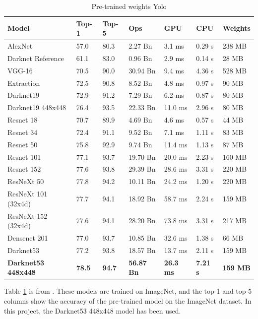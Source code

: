 \begin{table}[h!]
\begin{tabular}{lllllll}
Model               & Top-1 & Top-5 & Ops      & GPU     & CPU    & Weights \\ \hline
AlexNet             & 57.0  & 80.3  & 2.27 Bn  & 3.1 ms  & 0.29 s & 238 MB  \\
Darknet Reference   & 61.1  & 83.0  & 0.96 Bn  & 2.9 ms  & 0.14 s & 28 MB   \\
VGG-16              & 70.5  & 90.0  & 30.94 Bn & 9.4 ms  & 4.36 s & 528 MB  \\
Extraction          & 72.5  & 90.8  & 8.52 Bn  & 4.8 ms  & 0.97 s & 90 MB   \\
Darknet19           & 72.9  & 91.2  & 7.29 Bn  & 6.2 ms  & 0.87 s & 80 MB   \\
Darknet19 448x448   & 76.4  & 93.5  & 22.33 Bn & 11.0 ms & 2.96 s & 80 MB   \\
Resnet 18           & 70.7  & 89.9  & 4.69 Bn  & 4.6 ms  & 0.57 s & 44 MB   \\
Resnet 34           & 72.4  & 91.1  & 9.52 Bn  & 7.1 ms  & 1.11 s & 83 MB   \\
Resnet 50           & 75.8  & 92.9  & 9.74 Bn  & 11.4 ms & 1.13 s & 87 MB   \\
Resnet 101          & 77.1  & 93.7  & 19.70 Bn & 20.0 ms & 2.23 s & 160 MB  \\
Resnet 152          & 77.6  & 93.8  & 29.39 Bn & 28.6 ms & 3.31 s & 220 MB  \\
ResNeXt 50          & 77.8  & 94.2  & 10.11 Bn & 24.2 ms & 1.20 s & 220 MB  \\
ResNeXt 101 (32x4d) & 77.7  & 94.1  & 18.92 Bn & 58.7 ms & 2.24 s & 159 MB  \\
ResNeXt 152 (32x4d) & 77.6  & 94.1  & 28.20 Bn & 73.8 ms & 3.31 s & 217 MB  \\
Densenet 201        & 77.0  & 93.7  & 10.85 Bn & 32.6 ms & 1.38 s & 66 MB   \\
Darknet53           & 77.2  & 93.8  & 18.57 Bn & 13.7 ms & 2.11 s & 159 MB  \\
\textbf{Darknet53 448x448}   & \textbf{78.5}  & \textbf{94.7}  & \textbf{56.87 Bn} & \textbf{26.3 ms} & \textbf{7.21 s} & \textbf{159 MB} 
\end{tabular}
\caption{Pre-trained weights Yolo}
\label{yolo_tab}
\end{table}

Table \ref{yolo_tab} is from \citep{YOLOv3}. These models are trained on ImageNet, and the top-1 and top-5 columns show the accuracy of the pre-trained model on the ImageNet dataset. In this project, the Darknet53 448x448 model has been used. 



